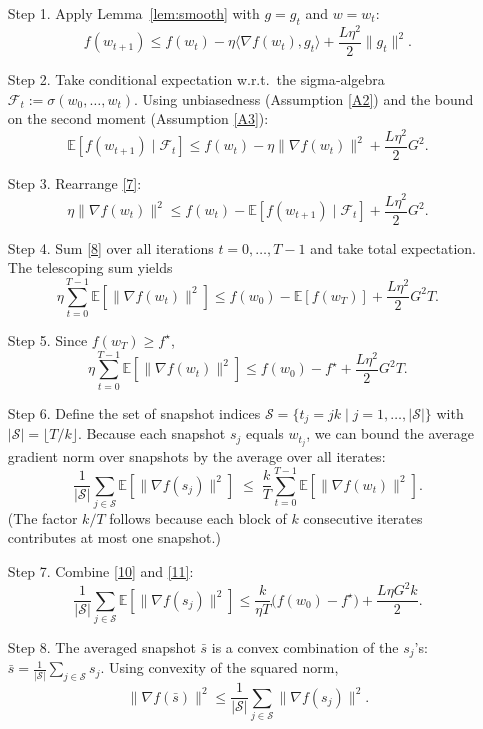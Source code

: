 \documentclass{article}
\newcommand{\E}{\mathbb{E}}
\begin{document}
\begin{enumerate}
\item[Step 1.] Apply Lemma~\ref{lem:smooth} with $g=g_t$ and $w=w_t$:
\[
f(w_{t+1})\le f(w_t)-\eta\langle\nabla f(w_t),g_t\rangle+\frac{L\eta^{2}}{2}\|g_t\|^{2}.
\tag{6}
\]

\item[Step 2.] Take conditional expectation w.r.t.\ the sigma‑algebra $\mathcal{F}_t:=\sigma(w_0,\dots,w_t)$.
Using unbiasedness (Assumption \ref{A2}) and the bound on the second moment (Assumption \ref{A3}):
\[
\E\!\left[f(w_{t+1})\mid\mathcal{F}_t\right]
\le f(w_t)-\eta\|\nabla f(w_t)\|^{2}
+\frac{L\eta^{2}}{2}G^{2}.
\tag{7}
\]

\item[Step 3.] Rearrange \eqref{7}:
\[
\eta\|\nabla f(w_t)\|^{2}
\le f(w_t)-\E\!\left[f(w_{t+1})\mid\mathcal{F}_t\right]
+\frac{L\eta^{2}}{2}G^{2}.
\tag{8}
\]

\item[Step 4.] Sum \eqref{8} over all iterations $t=0,\dots,T-1$ and take total expectation.
The telescoping sum yields
\[
\eta\sum_{t=0}^{T-1}\E\!\left[\|\nabla f(w_t)\|^{2}\right]
\le f(w_0)-\E\!\left[f(w_T)\right]
+\frac{L\eta^{2}}{2}G^{2}T.
\tag{9}
\]

\item[Step 5.] Since $f(w_T)\ge f^{\star}$,
\[
\eta\sum_{t=0}^{T-1}\E\!\left[\|\nabla f(w_t)\|^{2}\right]
\le f(w_0)-f^{\star}
+\frac{L\eta^{2}}{2}G^{2}T.
\tag{10}
\]

\item[Step 6.] Define the set of snapshot indices $\mathcal{S}=\{t_j=jk\mid j=1,\dots,|\mathcal{S}|\}$ with $|\mathcal{S}|=\lfloor T/k\rfloor$.  
Because each snapshot $s_j$ equals $w_{t_j}$, we can bound the average gradient norm over snapshots by the average over all iterates:
\[
\frac{1}{|\mathcal{S}|}\sum_{j\in\mathcal{S}}\E\!\left[\|\nabla f(s_j)\|^{2}\right]
\;\le\;
\frac{k}{T}\sum_{t=0}^{T-1}\E\!\left[\|\nabla f(w_t)\|^{2}\right].
\tag{11}
\]
(The factor $k/T$ follows because each block of $k$ consecutive iterates contributes at most one snapshot.)

\item[Step 7.] Combine \eqref{10} and \eqref{11}:
\[
\frac{1}{|\mathcal{S}|}\sum_{j\in\mathcal{S}}\E\!\left[\|\nabla f(s_j)\|^{2}\right]
\le
\frac{k}{\eta T}\bigl(f(w_0)-f^{\star}\bigr)
+\frac{L\eta G^{2}k}{2}.
\tag{12}
\]

\item[Step 8.] The averaged snapshot $\bar s$ is a convex combination of the $s_j$'s:
$\bar s=\frac{1}{|\mathcal{S}|}\sum_{j\in\mathcal{S}}s_j$.  
Using convexity of the squared norm,
\[
\|\nabla f(\bar s)\|^{2}
\le\frac{1}{|\mathcal{S}|}\sum_{j\in\mathcal{S}}\|\nabla f(s_j)\|^{2}.
\tag{13}
\]


\end{enumerate}
\end{document}
